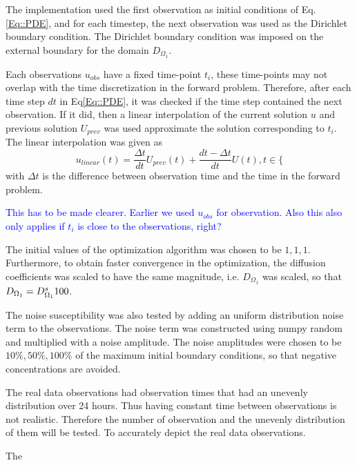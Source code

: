 \documentclass[11pt,a4paper]{article}
\newcommand{\kam}[1]{\textcolor{blue}{#1}}
\begin{document}
The implementation used the first observation as initial conditions of Eq.\ref{Eq::PDE}, and for each timestep, the next observation was used as the Dirichlet boundary condition. The Dirichlet boundary condition was imposed on the external boundary for the domain $D_{\Omega_1}$. 

Each observations $u_{obs}$ have a fixed time-point $t_i$, these time-points may not overlap with the time discretization in the forward problem. Therefore, after each time step $dt$ in Eq\ref{Eq::PDE}, it was checked if the time step contained the next observation. If it did, then a linear interpolation of the current solution $u$ and previous solution $U_{prev}$ was used approximate the solution corresponding to $t_i$. The linear interpolation was given as  
\begin{equation}
u_{linear}(t) = \frac{\Delta t}{dt} U_{prev}(t) + \frac{dt - \Delta t }{dt} U(t), t \in \lbrace 
\end{equation}
with $\Delta t$ is the difference between observation time and the time in the forward problem.


 \kam{This has to be made clearer. Earlier we used $u_{obs}$ for observation. Also this also only applies if $t_i$ is close to the observations, right?} 
 
 
 
The initial values of the optimization algorithm was chosen to be $1,1,1$. Furthermore, to obtain faster convergence in the optimization, the diffusion coefficients was scaled to have the same magnitude, i.e.  $D_{\Omega_1}$ was scaled, so that $D_{\Omega_1} = D\sp {s}_{\Omega_1}100$.     


The noise susceptibility was also tested by adding an uniform distribution noise term to the observations. The noise term was constructed using numpy random and multiplied with a noise amplitude. The noise amplitudes were chosen to be $ 10\%, 50\%, 100\%$ of the maximum initial boundary conditions, so that negative concentrations are avoided.  

The real data observations had observation times that had an unevenly distribution over 24 hours. Thus having  constant time between observations is not realistic. Therefore the number of observation and the unevenly distribution of them will be tested. To accurately depict the real data observations. 



The 
\end{document}
